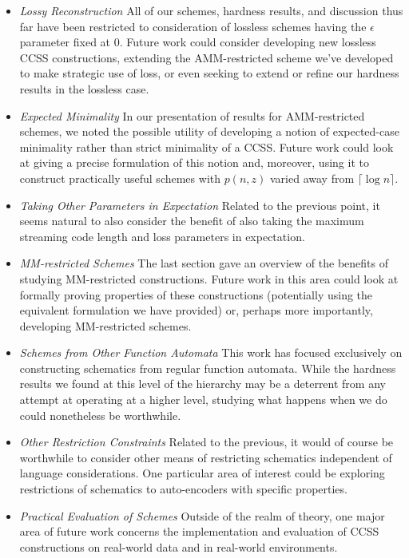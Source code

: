 \documentclass{article}
\theoremstyle{definition}
\begin{document}
\begin{itemize}
\item{\textit{Lossy Reconstruction } All of our schemes, hardness results, and 
discussion thus far have been restricted to consideration of lossless schemes 
having the $\epsilon$ parameter fixed at 0.  Future work could consider 
developing new lossless CCSS constructions, extending the AMM-restricted 
scheme we've developed to make strategic use of loss, or even seeking to extend or 
refine our hardness results in the lossless case.}
\item{\textit{Expected Minimality } In our presentation of results for AMM-restricted 
schemes, we noted the possible utility of developing a notion of expected-case 
minimality rather than strict minimality of a CCSS.  Future work could look at 
giving a precise formulation of this notion and, moreover, using it to 
construct practically useful schemes with $p(n,z)$ varied away from 
$\lceil \log{n} \rceil$.}
\item{\textit{Taking Other Parameters in Expectation } Related to the previous point, it 
seems natural to also consider the benefit of also taking the maximum streaming code 
length and loss parameters in expectation.}
\item{\textit{MM-restricted Schemes } The last section gave an overview of the 
benefits of studying MM-restricted constructions.  Future work in this area could 
look at formally proving properties of these constructions (potentially using the 
equivalent formulation we have provided) or, perhaps more importantly, 
developing MM-restricted schemes.}
\item{\textit{Schemes from Other Function Automata } This work has focused 
exclusively on constructing schematics from regular function automata.  While 
the hardness results we found at this level of the hierarchy may be a 
deterrent from any attempt at operating at a higher level, studying what happens 
when we do could nonetheless be worthwhile.}
\item{\textit{Other Restriction Constraints } Related to the previous, it would 
of course be worthwhile to consider other means of restricting schematics independent 
of language considerations.  One particular area of interest could be exploring 
restrictions of schematics to auto-encoders with specific properties.}
\item{\textit{Practical Evaluation of Schemes } Outside of the realm of theory, one
major area of future work concerns the implementation and evaluation of CCSS 
constructions on real-world data and in real-world environments.}
\end{itemize}
\end{document}
